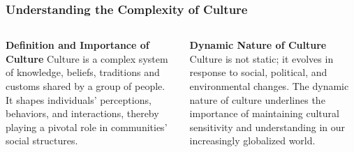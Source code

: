 \documentclass[5pt]{beamer}
\begin{document}
\begin{frame}
\frametitle{Understanding the Complexity of Culture}
\begin{columns}
\begin{column}{0.45\textwidth}
\begin{block}{\textbf{Definition and Importance of Culture}}
Culture is a complex system of knowledge, beliefs, traditions and customs shared by a group of people. It shapes individuals' perceptions, behaviors, and interactions, thereby playing a pivotal role in communities' social structures.
\end{block}
\end{column}
\begin{column}{0.45\textwidth}
\begin{block}{\textbf{Dynamic Nature of Culture}}
Culture is not static; it evolves in response to social, political, and environmental changes. The dynamic nature of culture underlines the importance of maintaining cultural sensitivity and understanding in our increasingly globalized world.
\end{block}
\end{column}
\end{columns}
\end{frame}
\end{document}
